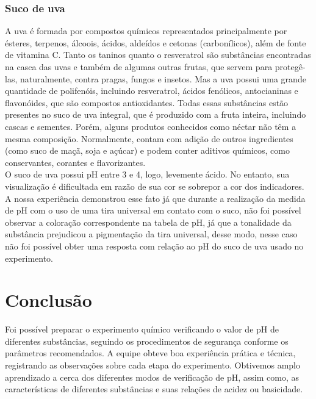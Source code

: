         \subsubsection{Suco de uva}\label{exp2:sucodeuva}
            \indent A uva é formada por compostos químicos representados principalmente por ésteres, terpenos, álcoois, ácidos, aldeídos e cetonas (carbonílicos), além de fonte de vitamina C. Tanto os taninos quanto o resveratrol são substâncias encontradas na casca das uvas e também de algumas outras frutas, que servem para protegê-las, naturalmente, contra pragas, fungos e insetos. Mas a uva possui uma grande quantidade de polifenóis, incluindo resveratrol, ácidos fenólicos, antocianinas e flavonóides, que são compostos antioxidantes. Todas essas substâncias estão presentes no suco de uva integral, que é produzido com a fruta inteira, incluindo cascas e sementes. Porém, alguns produtos conhecidos como néctar não têm a mesma composição. Normalmente, contam com adição de outros ingredientes (como suco de maçã, soja e açúcar) e podem conter aditivos químicos, como conservantes, corantes e flavorizantes.\\

            \indent O suco de uva possui pH entre 3 e 4, logo, levemente ácido. No entanto, sua visualização é dificultada em razão de sua cor se sobrepor a cor dos indicadores. A nossa experiência demonstrou esse fato já que durante a realização  da medida de pH com o uso de uma tira universal em contato com o suco, não foi possível observar a coloração correspondente na tabela de pH, já que a tonalidade da substância prejudicou a pigmentação da tira universal, desse modo, nesse caso não foi possível obter uma resposta com relação ao pH do suco de uva usado no experimento.\\
		
		\newpage
        \section{Conclusão}\label{exp2:conclusão}
            \indent Foi possível preparar o experimento químico verificando o valor de pH de diferentes substâncias, seguindo os procedimentos de segurança conforme os parâmetros recomendados. A equipe obteve boa experiência prática e técnica, registrando as observações sobre cada etapa do experimento. Obtivemos amplo aprendizado a cerca dos diferentes modos de verificação de pH, assim como, as características de diferentes substâncias e suas relações de acidez ou basicidade.\\
        
        \newpage



